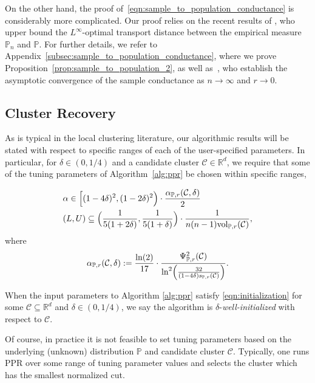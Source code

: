 \documentclass[twoside,11pt]{article}
\newcommand{\Reals}{\mathbb{R}}
\newcommand{\1}{\mathbf{1}}
\newcommand{\Rd}{\Reals^d}
\newcommand{\Leb}{L}
\newcommand{\mc}[1]{\mathcal{#1}}
\newcommand{\Pbb}{\mathbb{P}}
\newcommand{\vol}{\mathrm{vol}}
\begin{document}
On the other hand, the proof of~\eqref{eqn:sample_to_population_conductance} is considerably more complicated. Our proof relies on the recent results of \citet{garciatrillos16b}, who upper bound the  $\Leb^{\infty}$-optimal transport distance between the empirical measure $\Pbb_n$ and $\Pbb$. For further details, we refer to Appendix~\ref{subsec:sample_to_population_conductance}, where we prove Proposition~\ref{prop:sample_to_population_2}, as well as~\citet{garciatrillos16}, who establish the asymptotic convergence of the sample conductance as $n \to \infty$ and $r \to 0$.

\subsection{Cluster Recovery}
\label{subsec:cluster_recovery}
As is typical in the local clustering literature, our algorithmic results will be stated with respect to specific ranges of each of the user-specified
parameters. In particular, for $\delta \in (0,1/4)$ and a candidate cluster $\mc{C} \in \Rd$, we require that some of the tuning parameters of Algorithm~\ref{alg:ppr} be chosen within specific ranges, 

\begin{equation}
\label{eqn:initialization}
\begin{aligned}
& \alpha \in \Bigl[(1 - 4\delta)^2, (1 - 2\delta)^2\Bigr) \cdot
\frac{\alpha_{\Pbb,r}(\mc{C},\delta)}{2} \\
& (L,U) \subseteq \Bigl(\frac{1}{5(1 + 2\delta)},\frac{1}{5(1 + \delta)}\Bigr) \cdot 
\frac{1}{n(n - 1)\vol_{\Pbb,r}(\mc{C})},
\end{aligned}  
\end{equation}
where
\begin{equation}
\label{eqn:alpha_initialization}
\alpha_{\Pbb,r}(\mc{C},\delta) := \frac{\ln(2)}{17} \cdot \frac{\Psi_{\Pbb,r}^2(\mc{C})}{\ln^2\Bigl(\frac{32}{(1 - 4\delta)s_{\Pbb,r}(\mc{C})}\Bigr)}.
\end{equation}

\begin{definition}
	When the input parameters to Algorithm \ref{alg:ppr} satisfy \eqref{eqn:initialization} for some $\mc{C} \subseteq \Rd$ and $\delta \in (0,1/4)$, we say the algorithm is $\delta$-\emph{well-initialized} with respect to $\mc{C}$.
\end{definition}

Of course, in practice it is not feasible to set tuning parameters based on the underlying (unknown) distribution $\Pbb$ and candidate cluster $\mc{C}$. Typically, one runs PPR over some range of tuning parameter values and selects the cluster which has the smallest normalized cut. 
\end{document}
